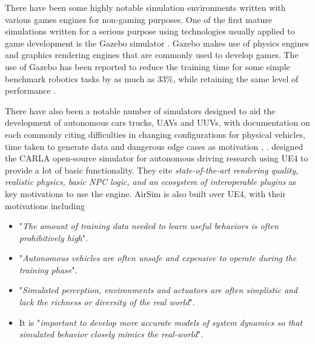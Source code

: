 There have been some highly notable simulation environments written with various games engines for non-gaming purposes. One of the first mature simulations written for a serious purpose using technologies usually applied to game development is the Gazebo simulator \cite{Koenig2005DesignSimulator}. Gazebo makes use of physics engines and graphics rendering engines that are commonly used to develop games. The use of Gazebo has been reported to reduce the training time for some simple benchmark robotics tasks by as much as 33\%, while retaining the same level of performance \cite{VilchesRobotGazebo}. 

There have also been a notable number of simulators designed to aid the development of autonomous cars trucks, UAVs and UUVs, with documentation on each commonly citing difficulties in changing configurations for physical vehicles, time taken to generate data and dangerous edge cases as motivation \cite{Dosovitskiy2017CARLA:Simulator} \cite{Wymann2015TORCS:Simulator}, \cite{ShahAirSim:Vehicles} \cite{Bojarski2016EndCars}. \citeauthor{Dosovitskiy2017CARLA:Simulator} designed the CARLA open-source simulator \cite{Dosovitskiy2017CARLA:Simulator} for autonomous driving research using UE4 to provide a lot of basic functionality. They cite \textit{state-of-the-art rendering quality, realistic physics, basic NPC logic, and an ecosystem of interoperable plugins} as key motivations to use the engine. AirSim \cite{ShahAirSim:Vehicles} is also built over UE4, with their motivations including
\begin{itemize}
    \item "\textit{The amount of training data needed to learn useful behaviors is often prohibitively high}".
    \item "\textit{Autonomous vehicles are often unsafe and expensive to operate during the training phase}".
    \item "\textit{Simulated perception, environments and actuators are often simplistic and lack the richness or diversity of the real world}".
    \item It is "\textit{important to develop more accurate models of system dynamics so that simulated behavior closely mimics the real-world}".
\end{itemize}

